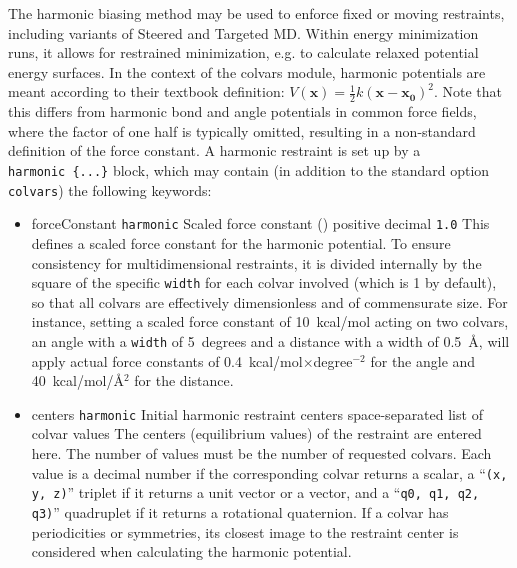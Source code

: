 \label{sec:colvarbias_harmonic}

The harmonic biasing method may be used to enforce fixed or moving restraints,
including variants of Steered and Targeted MD. Within energy minimization
runs, it allows for restrained minimization, e.g. to calculate relaxed potential
energy surfaces. In the context of the colvars module, 
harmonic potentials are meant according to their textbook definition:
$\displaystyle V(\bm{x}) = \frac{1}{2} k (\bm{x} - \bm{x_0})^2$.
Note that this differs from harmonic bond and angle potentials in common
force fields, where the factor of one half is typically omitted,
resulting in a non-standard definition of the force constant.
A harmonic restraint is set up by a \texttt{harmonic~\{...\}}
block, which may contain (in addition to the standard option
\texttt{colvars}) the following keywords:
\begin{itemize}

\item %
  \keydef
    {forceConstant}{%
    \texttt{harmonic}}{%
    Scaled force constant ()}{%
    positive decimal}{%
    \texttt{1.0}}{%
    This defines a scaled force constant for the harmonic potential.
    To ensure consistency for multidimensional restraints, it is
    divided internally by the square of the specific \texttt{width}
    for each colvar involved (which is 1 by default), so that all colvars
    are effectively dimensionless and of commensurate size.
    For instance, setting a scaled force constant of 10~kcal/mol acting
    on two colvars, an angle with a \texttt{width} of 5~degrees and a distance
    with a width of 0.5~\AA{}, will apply actual force constants of
    0.4~kcal/mol$\times$degree$^{-2}$ for the angle and
    40~kcal/mol/\AA$^2$ for the distance.}

\item %
  \key
    {centers}{%
    \texttt{harmonic}}{%
    Initial harmonic restraint centers}{%
    space-separated list of colvar values}{%
    The centers (equilibrium values) of the restraint are entered here.
    The number of values must be the number of requested colvars.
    Each value is a decimal number if the corresponding colvar returns
    a scalar, a ``\texttt{(x, y, z)}'' triplet if it returns a unit
    vector or a vector, and a ``\texttt{q0, q1, q2, q3)}'' quadruplet
    if it returns a rotational quaternion.  If a colvar has
    periodicities or symmetries, its closest image to the restraint
    center is considered when calculating the harmonic potential.}
\end{itemize}

